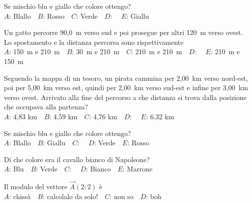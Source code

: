 \def\mcquestionnumber{12}


\mcquestionheader Se mischio blu e giallo che colore ottengo?\\
{$A$}: Blallo\ \ {$B$}: Rosso\ \ {$C$}: Verde\ \ {$D$}: \ \ {$E$}: Giallu\ \ 

\mcquestionfooter



\mcpaperfooter

\def\mcserialnumber{15}
\mcpaperheader


\def\mcquestionnumber{1}


\mcquestionheader Un gatto percorre 90,0~m verso sud e poi prosegue per altri 120~m verso ovest. Lo spostamento e la distanza percorsa sono rispettivamente\\
{$A$}: 150~m e 210~m\ \ {$B$}: 30~m e 210~m\ \ {$C$}: 210~m e 210~m\ \ {$D$}: \ \ {$E$}: 210~m e 150~m\ \ 

\mcquestionfooter



\def\mcquestionnumber{2}


\mcquestionheader Seguendo la mappa di un tesoro, un pirata cammina per 2,00~km verso nord-est, poi per 5,00~km verso est, quindi per 2,00~km verso sud-est e infine per 3,00~km verso ovest. Arrivato alla fine del percorso a che distanza si trova dalla posizione che occupava alla partenza?\\
{$A$}: 4,83 km\ \ {$B$}: 4,59 km\ \ {$C$}: 4,76 km\ \ {$D$}: \ \ {$E$}: 6,32 km\ \ 

\mcquestionfooter



\def\mcquestionnumber{3}


\mcquestionheader Se mischio blu e giallo che colore ottengo?\\
{$A$}: Blallo\ \ {$B$}: Giallu\ \ {$C$}: \ \ {$D$}: Verde\ \ {$E$}: Rosso\ \ 

\mcquestionfooter



\def\mcquestionnumber{4}


\mcquestionheader Di che colore era il cavallo bianco di Napoleone?\\
{$A$}: Blu\ \ {$B$}: Verde\ \ {$C$}: \ \ {$D$}: Bianco\ \ {$E$}: Marrone\ \ 

\mcquestionfooter



\def\mcquestionnumber{5}


\mcquestionheader Il modulo del vettore $\vec{A}(2;2)$ è\\
{$A$}: chissà\ \ {$B$}: calcolalo da solo!\ \ {$C$}: non so\ \ {$D$}: boh\ \ 

